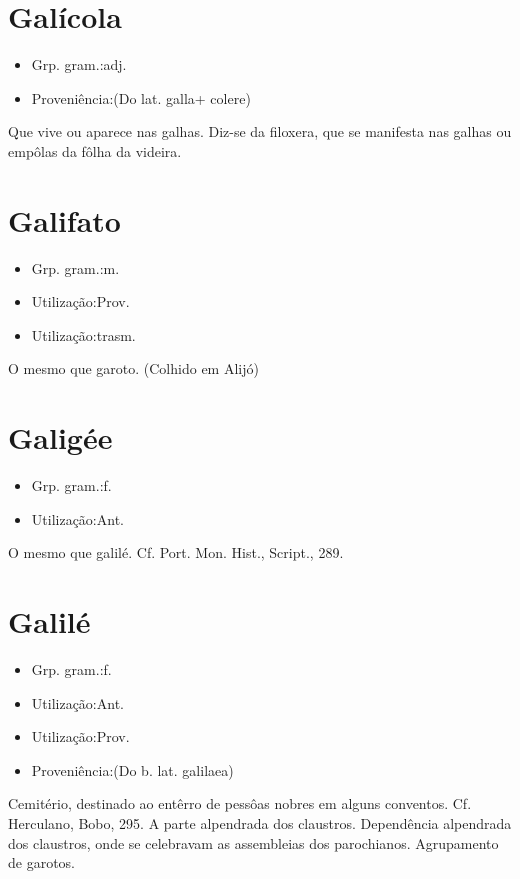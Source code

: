 \section{Galícola}
\begin{itemize}
\item {Grp. gram.:adj.}
\end{itemize}
\begin{itemize}
\item {Proveniência:(Do lat. \textunderscore galla\textunderscore  + \textunderscore colere\textunderscore )}
\end{itemize}
Que vive ou aparece nas galhas.
Diz-se da filoxera, que se manifesta nas galhas ou empôlas da fôlha da videira.
\section{Galifato}
\begin{itemize}
\item {Grp. gram.:m.}
\end{itemize}
\begin{itemize}
\item {Utilização:Prov.}
\end{itemize}
\begin{itemize}
\item {Utilização:trasm.}
\end{itemize}
O mesmo que \textunderscore garoto\textunderscore . (Colhido em Alijó)
\section{Galigée}
\begin{itemize}
\item {Grp. gram.:f.}
\end{itemize}
\begin{itemize}
\item {Utilização:Ant.}
\end{itemize}
O mesmo que \textunderscore galilé\textunderscore . Cf. \textunderscore Port. Mon. Hist.\textunderscore , \textunderscore Script.\textunderscore , 289.
\section{Galilé}
\begin{itemize}
\item {Grp. gram.:f.}
\end{itemize}
\begin{itemize}
\item {Utilização:Ant.}
\end{itemize}
\begin{itemize}
\item {Utilização:Prov.}
\end{itemize}
\begin{itemize}
\item {Proveniência:(Do b. lat. \textunderscore galilaea\textunderscore )}
\end{itemize}
Cemitério, destinado ao entêrro de pessôas nobres em alguns conventos. Cf. Herculano, \textunderscore Bobo\textunderscore , 295.
A parte alpendrada dos claustros.
Dependência alpendrada dos claustros, onde se celebravam as assembleias dos parochianos.
Agrupamento de garotos.
